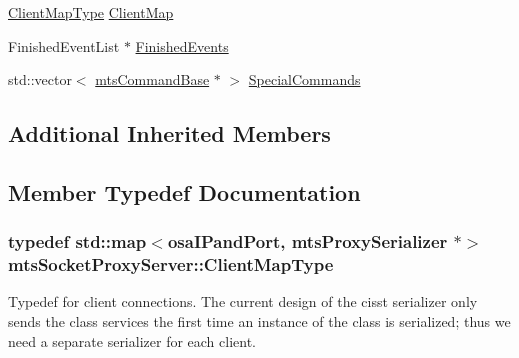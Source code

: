 \begin{DoxyCompactItemize}
\item 
\hyperlink{classmts_socket_proxy_server_a7119b8c41d2a72f7234f77bdcc1e2fad}{Client\+Map\+Type} \hyperlink{classmts_socket_proxy_server_acb24d470395fe5cad656863434c0ef52}{Client\+Map}
\item 
Finished\+Event\+List $\ast$ \hyperlink{classmts_socket_proxy_server_a1907551b9d6dd7bcb7e46668686d29e1}{Finished\+Events}
\item 
std\+::vector$<$ \hyperlink{classmts_command_base}{mts\+Command\+Base} $\ast$ $>$ \hyperlink{classmts_socket_proxy_server_a033ddf4256700a5393055451d6f883a0}{Special\+Commands}
\end{DoxyCompactItemize}
\subsection*{Additional Inherited Members}


\subsection{Member Typedef Documentation}
\hypertarget{classmts_socket_proxy_server_a7119b8c41d2a72f7234f77bdcc1e2fad}{}
\subsubsection[{Client\+Map\+Type}]{\setlength{\rightskip}{0pt plus 5cm}typedef std\+::map$<${\bf osa\+I\+Pand\+Port}, mts\+Proxy\+Serializer $\ast$$>$ {\bf mts\+Socket\+Proxy\+Server\+::\+Client\+Map\+Type}\hspace{0.3cm}{\ttfamily [protected]}}\label{classmts_socket_proxy_server_a7119b8c41d2a72f7234f77bdcc1e2fad}
Typedef for client connections. The current design of the cisst serializer only sends the class services the first time an instance of the class is serialized; thus we need a separate serializer for each client. \hypertarget{classmts_socket_proxy_server_ae784ef6005901f988064e99f28bc4dc4}{}
